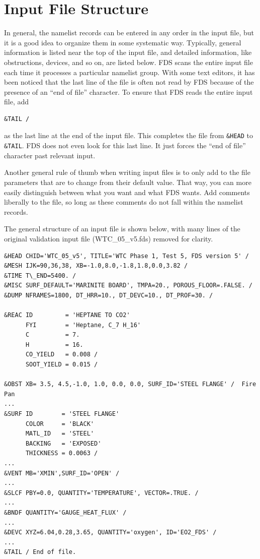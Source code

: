 \documentclass[11pt]{book}
\newcommand{\ct}{\tt\small}
\begin{document}
\section{Input File Structure}

In general, the namelist records can be entered in any order in the input file, but it is a good idea to organize them
in some systematic way. Typically, general information is listed near the top of the input file, and detailed information, like
obstructions, devices, and so on, are listed below. FDS scans the entire input file each time it processes a particular namelist group.
With some text editors, it has been noticed that the last line of the file is often not read by FDS because of the presence of an
``end of file'' character.
To ensure that FDS reads the entire input file, add 

\footnotesize
\begin{verbatim}
&TAIL /
\end{verbatim}
\normalsize \noindent
as the last line at the end of the input file. This completes the file from {\ct \&HEAD} to {\ct \&TAIL}. FDS does not even look for
this last line. It just forces the ``end of file'' character past relevant input.

Another general rule of thumb when writing input files is to only add to the file parameters that are to change from their
default value. That way, you can more easily distinguish between what you want and what FDS wants. Add comments liberally to the file, so long as
these comments do not fall within the namelist records.

The general structure of an input file is shown below, with many
lines of the original validation input file (WTC\_05\_v5.fds) removed for clarity.

\footnotesize
\begin{verbatim}
&HEAD CHID='WTC_05_v5', TITLE='WTC Phase 1, Test 5, FDS version 5' /
&MESH IJK=90,36,38, XB=-1.0,8.0,-1.8,1.8,0.0,3.82 /
&TIME T\_END=5400. /
&MISC SURF_DEFAULT='MARINITE BOARD', TMPA=20., POROUS_FLOOR=.FALSE. /
&DUMP NFRAMES=1800, DT_HRR=10., DT_DEVC=10., DT_PROF=30. /

&REAC ID         = 'HEPTANE TO CO2'
      FYI        = 'Heptane, C_7 H_16'
      C          = 7.
      H          = 16.
      CO_YIELD   = 0.008 /
      SOOT_YIELD = 0.015 /

&OBST XB= 3.5, 4.5,-1.0, 1.0, 0.0, 0.0, SURF_ID='STEEL FLANGE' /  Fire Pan
...
&SURF ID        = 'STEEL FLANGE'
      COLOR     = 'BLACK'
      MATL_ID   = 'STEEL'
      BACKING   = 'EXPOSED'
      THICKNESS = 0.0063 /
...
&VENT MB='XMIN',SURF_ID='OPEN' /
...
&SLCF PBY=0.0, QUANTITY='TEMPERATURE', VECTOR=.TRUE. /
...
&BNDF QUANTITY='GAUGE_HEAT_FLUX' /
...
&DEVC XYZ=6.04,0.28,3.65, QUANTITY='oxygen', ID='EO2_FDS' /
...
&TAIL / End of file.
\end{verbatim}
\normalsize
\end{document}
